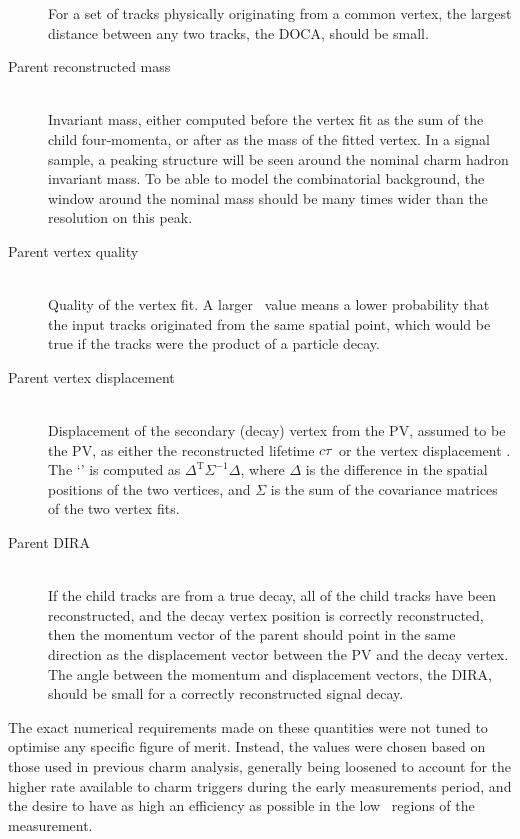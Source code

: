 \begin{description}
    For a set of tracks physically originating from a common vertex, the 
    largest distance between any two tracks, the \ac{DOCA}, should be small.
  \item[Parent reconstructed mass] \hfill \\
    Invariant mass, either computed before the vertex fit as the sum of the 
    child four-momenta, or after as the mass of the fitted vertex.
    In a signal sample, a peaking structure will be seen around the nominal 
    charm hadron invariant mass.
    To be able to model the combinatorial background, the window around the 
    nominal mass should be many times wider than the resolution on this peak.
  \item[Parent vertex quality] \hfill \\
    Quality of the vertex fit.
    A larger \chisq\ value means a lower probability that the input tracks 
    originated from the same spatial point, which would be true if the tracks 
    were the product of a particle decay.
  \item[Parent vertex displacement] \hfill \\
    Displacement of the secondary (decay) vertex from the \ac{PV}, assumed to 
    be the \ac{PV}, as either the reconstructed lifetime $c\tau$ or the 
    vertex displacement \chisq.
    The `\chisq' is computed as $\Delta^{\text{T}}\Sigma^{-1}\Delta$, where 
    $\Delta$ is the difference in the spatial positions of the two vertices, and 
    $\Sigma$ is the sum of the covariance matrices of the two vertex fits.
  \item[Parent \ac{DIRA}] \hfill \\
    If the child tracks are from a true decay, all of the child tracks have 
    been reconstructed, and the decay vertex position is correctly 
    reconstructed, then the momentum vector of the parent should point in the 
    same direction as the displacement vector between the \ac{PV} and the decay 
    vertex.
    The angle between the momentum and displacement vectors, the \ac{DIRA}, 
    should be small for a correctly reconstructed signal decay.
\end{description}

The exact numerical requirements made on these quantities were not tuned to 
optimise any specific figure of merit.
Instead, the values were chosen based on those used in previous charm analysis, 
generally being loosened to account for the higher rate available to charm 
triggers during the early measurements period, and the desire to have as high 
an efficiency as possible in the low \pT\ regions of the measurement.


